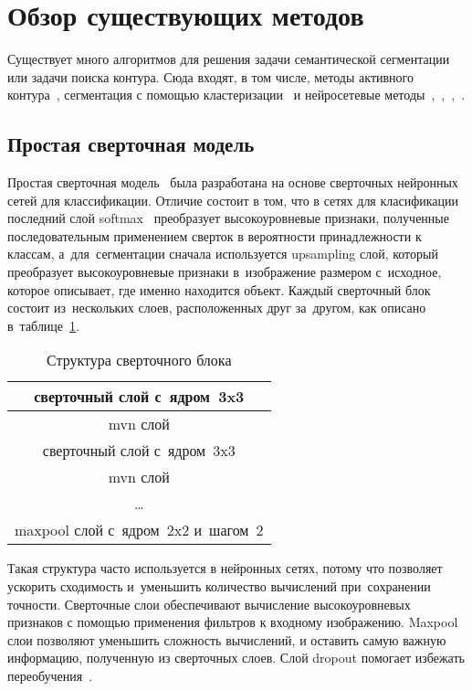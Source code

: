 \section{Обзор существующих методов}

Существует много алгоритмов для решения задачи семантической сегментации или задачи поиска контура. Сюда входят, в том числе, методы активного контура~\cite{snakes}, сегментация с помощью кластеризации~\cite{clustering_segm} и нейросетевые методы~\cite{fcn},~\cite{unet},~\cite{gridnet},~\cite{deeplab}.

\subsection{Простая сверточная модель}

Простая сверточная модель~\cite{fcn_1_layer_upsample} была разработана на основе сверточных нейронных сетей для классификации. Отличие состоит в том, что в сетях для класификации последний слой softmax~\cite{classification_loss} преобразует высокоуровневые признаки, полученные последовательным применением сверток в вероятности принадлежности к классам, а~для~сегментации сначала используется upsampling слой, который преобразует высокоуровневые признаки в~изображение размером с~исходное, которое описывает, где именно находится объект. Каждый сверточный блок состоит из~нескольких слоев, расположенных друг за~другом, как описано в~таблице~\ref{tab:conv_block}.

\begin{table}[b]
  \begin{center}
    \caption{Структура сверточного блока} \label{tab:conv_block}
    \begin{tabular}{ c }
      \hline
      сверточный слой с~ядром~3x3           \\ \hline
      mvn слой                              \\ \hline
      сверточный слой с~ядром~3x3           \\ \hline
      mvn слой                              \\ \hline
      \dots                                 \\ \hline
      maxpool слой с~ядром~2x2 и~шагом~2    \\ 
      \hline
    \end{tabular}
  \end{center}
\end{table}

Такая структура часто используется в нейронных сетях, потому что позволяет ускорить сходимость и~уменьшить количество вычислений при~сохранении точности. Сверточные слои обеспечивают вычисление высокоуровневых признаков с помощью применения фильтров к входному изображению. Maxpool слои позволяют уменьшить сложность вычислений, и оставить самую важную информацию, полученную из сверточных слоев. Слой dropout помогает избежать переобучения~\cite{dropout}. 

